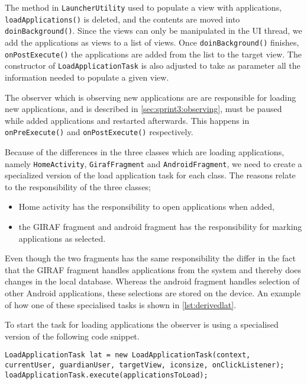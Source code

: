 The method in \lstinline!LauncherUtility! used to populate a view with applications, \lstinline!loadApplications()! is deleted, and the contents are moved into \lstinline!doinBackground()!.
Since the views can only be manipulated in the UI thread, we add the applications as views to a list of views.
Once \lstinline!doinBackground()! finishes, \lstinline!onPostExecute()! the applications are added from the list to the target view. 
The constructor of \lstinline!LoadApplicationTask! is also adjusted to take as parameter all the information needed to populate a given view.

The observer which is observing new applications are are responsible for loading new applications, and is described in \cref{sec:sprint3:observing}, must be paused while added applications and restarted afterwards.
This happens in \lstinline!onPreExecute()! and \lstinline!onPostExecute()! respectively.

Because of the differences in the three classes which are loading applications, namely \lstinline!HomeActivity!, \lstinline!GirafFragment! and \lstinline!AndroidFragment!, we need to create a specialized version of the load application task for each class.
The reasons relate to the responsibility of the three classes;
\begin{itemize}
	\item Home activity has the responsibility to open applications when added,
	\item the GIRAF fragment and android fragment has the responsibility for marking applications as selected.
\end{itemize}
Even though the two fragments has the same responsibility the differ in the fact that the GIRAF fragment handles applications from the \giraf system and thereby does changes in the local database.
Whereas the android fragment handles selection of other Android applications, these selections are stored on the device.
An example of how one of these specialised tasks is shown in \cref{lst:derivedlat}.

To start the task for loading applications the observer is using a specialised version of the following code snippet.
\begin{lstlisting}[caption={A simplified code snippet for starting loading applications into a view.}, label={lst:simplelat}]
LoadApplicationTask lat = new LoadApplicationTask(context, currentUser, guardianUser, targetView, iconsize, onClickListener);
loadApplicationTask.execute(applicationsToLoad);
\end{lstlisting}
